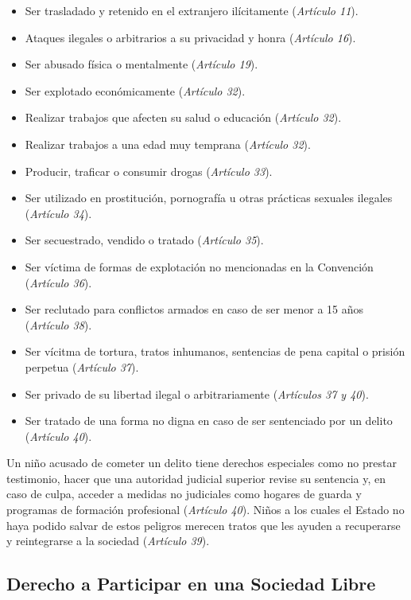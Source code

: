 \documentclass{tufte-handout}
\begin{document}
\begin{itemize}
\item{Ser trasladado y retenido en el extranjero ilícitamente (\textit{Artículo 11}).}
\item{Ataques ilegales o arbitrarios a su privacidad y honra (\textit{Artículo 16}).}
\item{Ser abusado física o mentalmente (\textit{Artículo 19}).}
\item{Ser explotado económicamente (\textit{Artículo 32}).}
\item{Realizar trabajos que afecten su salud o educación (\textit{Artículo 32}).}
\item{Realizar trabajos a una edad muy temprana (\textit{Artículo 32}).}
\item{Producir, traficar o consumir drogas (\textit{Artículo 33}).}
\item{Ser utilizado en prostitución, pornografía u otras prácticas sexuales ilegales (\textit{Artículo 34}).}
\item{Ser secuestrado, vendido o tratado (\textit{Artículo 35}).}
\item{Ser víctima de formas de explotación no mencionadas en la Convención (\textit{Artículo 36}).}
\item{Ser reclutado para conflictos armados en caso de ser menor a 15 años (\textit{Artículo 38}).}
\item{Ser vícitma de tortura, tratos inhumanos, sentencias de pena capital o prisión perpetua (\textit{Artículo 37}).}
\item{Ser privado de su libertad ilegal o arbitrariamente (\textit{Artículos 37 y 40}).}
\item{Ser tratado de una forma no digna en caso de ser sentenciado por un delito (\textit{Artículo 40}).}
\end{itemize}

Un niño acusado de cometer un delito tiene derechos especiales como no prestar testimonio, hacer que una autoridad judicial superior revise su sentencia y, en caso de culpa, acceder a medidas no judiciales como hogares de guarda y programas de formación profesional (\textit{Artículo 40}). Niños a los cuales el Estado no haya podido salvar de estos peligros merecen tratos que les ayuden a recuperarse y reintegrarse a la sociedad (\textit{Artículo 39}).

\subsection{Derecho a Participar en una Sociedad Libre}\label{subsec:participar}
\end{document}
